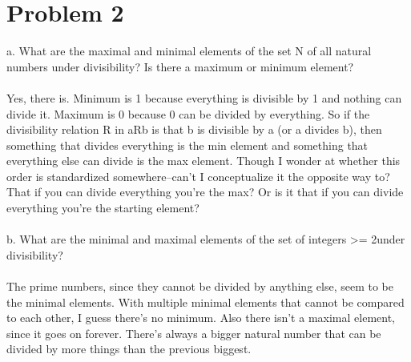 \documentclass{article}
\begin{document}
\section{Problem 2}
a. What are the maximal and minimal elements of the set N of all natural numbers under divisibility? Is there a maximum or minimum element? 
\\\\
Yes, there is. Minimum is 1 because everything is divisible by 1 and nothing can divide it. Maximum is 0 because 0 can be divided by everything. So if the divisibility relation R in aRb is that b is divisible by a (or a divides b), then something that divides everything is the min element and something that everything else can divide is the max element. Though I wonder at whether this order is standardized somewhere--can't I conceptualize it the opposite way to? That if you can divide everything you're the max? Or is it that if you can divide everything you're the starting element? 
\\\\
b. What are the minimal and maximal elements of the set of integers >= 2under divisibility?
\\\\
The prime numbers, since they cannot be divided by anything else, seem to be the minimal elements. With multiple minimal elements that cannot be compared to each other, I guess there's no minimum. Also there isn't a maximal element, since it goes on forever. There's always a bigger natural number that can be divided by more things than the previous biggest. 
\end{document}
